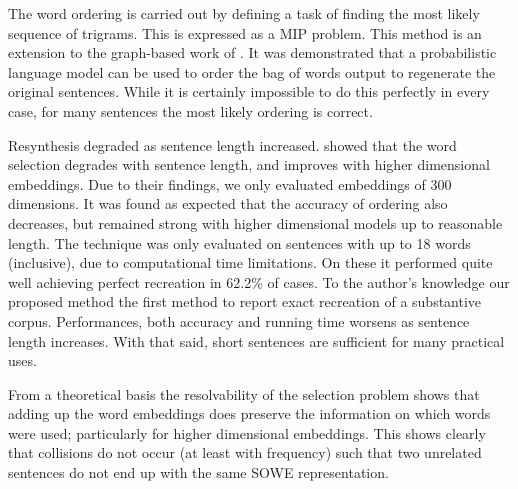 \documentclass[11pt]{article}
\theoremstyle{plain}
\theoremstyle{definition}
\newcommand{\textcite}{\protect\newcite}
\begin{document}
The word ordering is carried out by defining a task of finding the most likely sequence of trigrams. This is expressed as a MIP problem. This method is an extension to the graph-based work of \textcite{Horvat2014}. It was demonstrated that a probabilistic language model can be used to order the bag of words output to regenerate the original sentences. While it is certainly impossible to do this perfectly in every case, for many sentences the most likely ordering is correct.

Resynthesis degraded as sentence length increased. \textcite{White2015BOWgen} showed that the word selection degrades with sentence length, and improves with higher dimensional embeddings. Due to their findings, we only evaluated embeddings of 300 dimensions. It was found as expected that the accuracy of ordering also decreases, but remained strong with higher dimensional models up to reasonable length. The technique was only evaluated on sentences with up to 18 words (inclusive), due to computational time limitations. On these it performed quite well achieving perfect recreation in 62.2\% of cases. To the author's knowledge our proposed method the first method to report exact recreation of a substantive corpus. Performances, both accuracy and running time worsens as sentence length increases. With that said, short sentences are sufficient for many practical uses.

From a theoretical basis the resolvability of the selection problem shows that adding up the word embeddings does preserve the information on which words were used; particularly for higher dimensional embeddings. This shows clearly that collisions do not occur (at least with frequency) such that two unrelated sentences do not end up with the same SOWE representation. 



\end{document}
